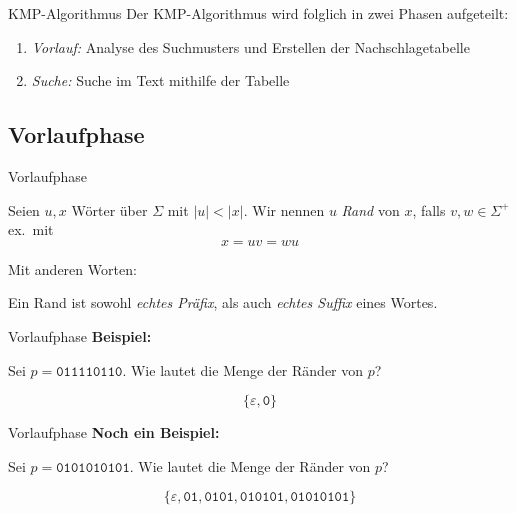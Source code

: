 \documentclass[xcolor=dvipsnames, aspectratio=169]{beamer}
\begin{document}
\begin{frame}{KMP-Algorithmus}
Der KMP-Algorithmus wird folglich in zwei Phasen aufgeteilt:\bigskip

\begin{enumerate}[1.]
\item \textit{Vorlauf:} Analyse des Suchmusters und Erstellen der Nachschlagetabelle
\item \textit{Suche:} Suche im Text mithilfe der Tabelle
\end{enumerate}
\end{frame}

\subsection{Vorlaufphase}

\begin{frame}{Vorlaufphase}
\begin{defi}
Seien $u,x$ Wörter über $\Sigma$ mit $\vert u\vert <\vert x\vert$. Wir nennen $u$ \textit{Rand} von $x$, falls $v,w\in\Sigma^+$ ex.\ mit \[x=uv=wu\]
\end{defi}
\pause\bigskip
Mit anderen Worten:\smallskip

Ein Rand ist sowohl \emph{echtes Präfix}, als auch \emph{echtes Suffix} eines Wortes.
\end{frame}

\begin{frame}{Vorlaufphase}
\textbf{Beispiel:}\bigskip

Sei $p=\texttt{011110110}$. Wie lautet die Menge der Ränder von $p$?\pause

\[\{\varepsilon,\texttt{0}\}\]
\end{frame}

\begin{frame}{Vorlaufphase}
\textbf{Noch ein Beispiel:}\bigskip

Sei $p=\texttt{0101010101}$. Wie lautet die Menge der Ränder von $p$?\pause

\[\{\varepsilon,\texttt{01},\texttt{0101},\texttt{010101},\texttt{01010101}\}\]
\end{frame}
\end{document}
